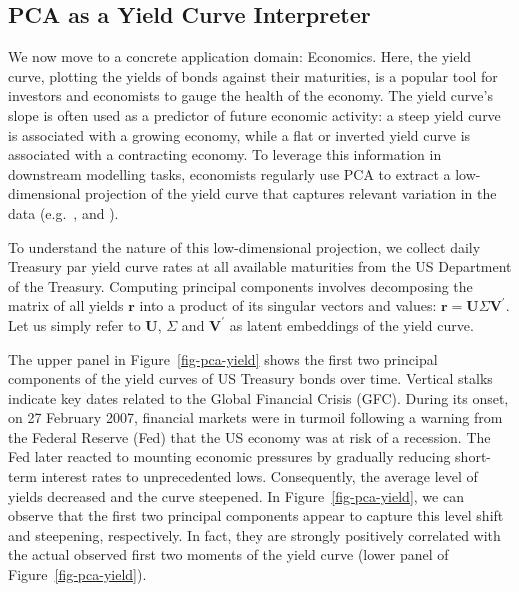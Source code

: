 \subsection{PCA as a Yield Curve Interpreter}\label{example-principal-component-analysis}

We now move to a concrete application domain: Economics. Here, the yield curve, plotting the yields of bonds against their maturities, is a popular tool for investors and economists to gauge the health of the economy. The yield curve's slope is often used as a predictor of future economic activity: a steep yield curve is associated with a growing economy, while a flat or inverted yield curve is associated with a contracting economy. To leverage this information in downstream modelling tasks, economists regularly use PCA to extract a low-dimensional projection of the yield curve that captures relevant variation in the data (e.g.\ \citet{berardi2022dissecting}, \citet{kumar2022effective} and \citet{crump2019deconstructing}).

To understand the nature of this low-dimensional projection, we collect daily Treasury par yield curve rates at all available maturities from the US Department of the Treasury. Computing principal components involves decomposing the matrix of all yields \(\mathbf{r}\) into a product of its singular vectors and values: \(\mathbf{r}=\mathbf{U}\Sigma\mathbf{V}^{\prime}\). Let us simply refer to \(\mathbf{U}\), \(\Sigma\) and \(\mathbf{V}^{\prime}\) as latent embeddings of the yield curve.

The upper panel in Figure~\ref{fig-pca-yield} shows the first two principal components of the yield curves of US Treasury bonds over time. Vertical stalks indicate key dates related to the Global Financial Crisis (GFC). During its onset, on 27 February 2007, financial markets were in turmoil following a warning from the Federal Reserve (Fed) that the US economy was at risk of a recession. The Fed later reacted to mounting economic pressures by gradually reducing short-term interest rates to unprecedented lows. Consequently, the average level of yields decreased and the curve steepened. In Figure~\ref{fig-pca-yield}, we can observe that the first two principal components appear to capture this level shift and steepening, respectively. In fact, they are strongly positively correlated with the actual observed first two moments of the yield curve (lower panel of Figure~\ref{fig-pca-yield}).


